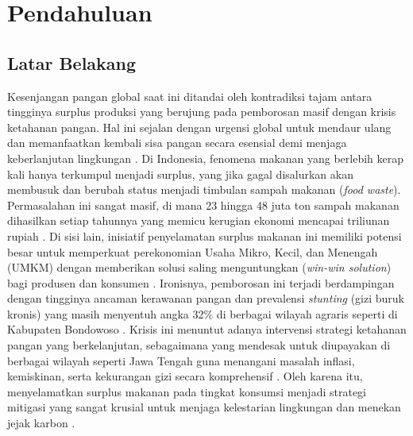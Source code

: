 
\chapter{Pendahuluan}
\label{chapter:pendahuluan}
\section{Latar Belakang}
Kesenjangan pangan global saat ini ditandai oleh kontradiksi tajam antara tingginya surplus produksi yang berujung pada pemborosan masif dengan krisis ketahanan pangan. Hal ini sejalan dengan urgensi global untuk mendaur ulang dan memanfaatkan kembali sisa pangan secara esensial demi menjaga keberlanjutan lingkungan \cite{raiEssentialRecyclingRepurposing2025a}. Di Indonesia, fenomena makanan yang berlebih kerap kali hanya terkumpul menjadi surplus, yang jika gagal disalurkan akan membusuk dan berubah status menjadi timbulan sampah makanan (\textit{food waste}). Permasalahan ini sangat masif, di mana 23 hingga 48 juta ton sampah makanan dihasilkan setiap tahunnya yang memicu kerugian ekonomi mencapai triliunan rupiah \cite{immawanFoodWasteIndonesia2024a}. Di sisi lain, inisiatif penyelamatan surplus makanan ini memiliki potensi besar untuk memperkuat perekonomian Usaha Mikro, Kecil, dan Menengah (UMKM) dengan memberikan solusi saling menguntungkan (\textit{win-win solution}) bagi produsen dan konsumen \cite{yulianaPotensiGerakanFood2022b}. Ironisnya, pemborosan ini terjadi berdampingan dengan tingginya ancaman kerawanan pangan dan prevalensi \textit{stunting} (gizi buruk kronis) yang masih menyentuh angka 32\% di berbagai wilayah agraris seperti di Kabupaten Bondowoso \cite{prayitnoExploringRoleFood2025b}. Krisis ini menuntut adanya intervensi strategi ketahanan pangan yang berkelanjutan, sebagaimana yang mendesak untuk diupayakan di berbagai wilayah seperti Jawa Tengah guna menangani masalah inflasi, kemiskinan, serta kekurangan gizi secara komprehensif \cite{pujiyantoStrategiKetahananPangan2025b}. Oleh karena itu, menyelamatkan surplus makanan pada tingkat konsumsi menjadi strategi mitigasi yang sangat krusial untuk menjaga kelestarian lingkungan dan menekan jejak karbon \cite{liuExploringHouseholdFood2023b}.

